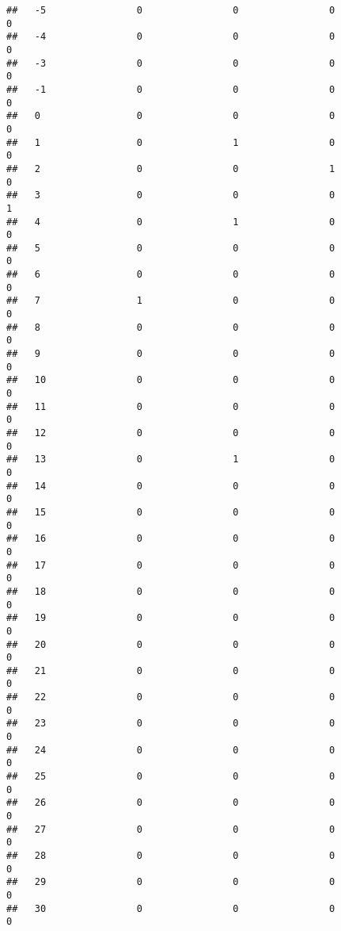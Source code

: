 \documentclass[]{article}
\begin{document}
\begin{verbatim}
##   -5                0                0                0                0
##   -4                0                0                0                0
##   -3                0                0                0                0
##   -1                0                0                0                0
##   0                 0                0                0                0
##   1                 0                1                0                0
##   2                 0                0                1                0
##   3                 0                0                0                1
##   4                 0                1                0                0
##   5                 0                0                0                0
##   6                 0                0                0                0
##   7                 1                0                0                0
##   8                 0                0                0                0
##   9                 0                0                0                0
##   10                0                0                0                0
##   11                0                0                0                0
##   12                0                0                0                0
##   13                0                1                0                0
##   14                0                0                0                0
##   15                0                0                0                0
##   16                0                0                0                0
##   17                0                0                0                0
##   18                0                0                0                0
##   19                0                0                0                0
##   20                0                0                0                0
##   21                0                0                0                0
##   22                0                0                0                0
##   23                0                0                0                0
##   24                0                0                0                0
##   25                0                0                0                0
##   26                0                0                0                0
##   27                0                0                0                0
##   28                0                0                0                0
##   29                0                0                0                0
##   30                0                0                0                0

\end{verbatim}
\end{document}
